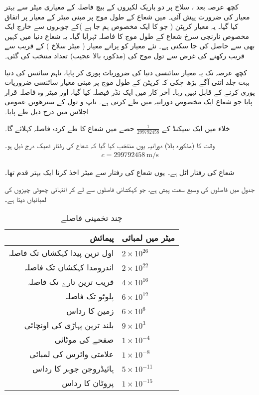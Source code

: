 کچھ عرصہ   بعد ، سلاخ  پر دو باریک لکیروں کے بیچ فاصلہ  کے معیاری میٹر سے بہتر معیار کی ضرورت پیش آئی۔  میں شعاع کے  طول موج پر مبنی میٹر کے   معیار پر اتفاق   کیا گیا۔ یہ معیار کرپٹن  (  جو کا ایک مخصوص ہم جا ہے )کے جوہروں سے خارج ایک مخصوص نارنجی  سرخ  شعاع کے   طول موج کا فاصلہ  ٹہرایا گیا۔ یہ شعاع دنیا میں کہیں بھی   سے حاصل کی جا سکتی ہے۔ نئے معیار  کو پرانے  معیار ( میٹر سلاخ  ) کے قریب سے قریب  رکھنے کی غرض سے تول موج کی  (مذکورہ بالا عجیب) تعداد منتخب کی گئی۔

کچھ عرصہ   تک یہ معیار سائنسی دنیا کی ضروریات  پوری  کر  پایا، تاہم سائنس کی دنیا    بہت جلد اتنی آگے بڑھ چکی کہ کرپٹن  کے طول موج پر مبنی معیار سائنسی ضروریات پوری کرنے   کے قابل نہیں رہا۔  آخر کار   میں  ایک نڈر فیصلہ کیا گیا، اور میٹر وہ فاصلہ قرار پایا جو شعاع ایک مخصوص دورانیہ میں طے کرتی ہے۔ ناپ  و  تول کے سترھویں   عمومی اجلاس میں درج ذیل  طے پایا۔

خلاء میں ایک سیکنڈ کے \(\tfrac{1}{299792458}\) حصے میں شعاع کا طے کردہ فاصلہ  کہلائے گا۔

وقت کا  (مذکورہ بالا)  دورانیہ یوں منتخب کیا گیا کہ شعاع  کی رفتار   ٹھیک درج ذیل ہو۔
\begin{align*}
c = \SI{299792458}{\meter\per\second}
\end{align*}


شعاع کی رفتار اٹل ہے۔ یوں   شعاع کی رفتار  سے  میٹر اخذ کرنا ایک بہتر قدم تھا۔

جدول  میں  فاصلوں کی  وسیع سعت  پیش ہے،  جو   کہکشانی فاصلوں  سے لے کر انتہائی چھوٹی چیزوں کی لمبائیاں دیتا ہے۔
\begin{table}[h!]
\caption{چند تخمینی فاصلے}
\label{جدول_پیمائش_چند_تخمینی_فاصلے}
\centering
\begin{tabular}{r l} 
\toprule
  پیمائش& میٹر  میں لمبائی\\
\midrule
 اول ترین  پیدا کہکشاں تک فاصلہ& $2\times 10^{26}$ \\
  اندرومدا کہکشاں تک فاصلہ & $2\times 10^{22}$\\
  قریب ترین تارے  تک فاصلہ & $4\times 10^{16}$\\
  پلوٹو تک فاصلہ & $6\times 10^{12}$\\
 زمین کا رداس & $6\times 10^{6}$ \\
  بلند ترین پہاڑی کی  اونچائی & $9\times 10^{3}$\\
 صفحے کی موٹائی &  $1\times 10^{-4}$\\
  علامتی وائرس کی لمبائی & $1\times 10^{-8}$\\
  ہائیڈروجن  جوہر کا رداس & $5\times 10^{-11}$\\
  پروٹان کا رداس & $1\times 10^{-15}$\\
\bottomrule
\end{tabular}
\end{table}


